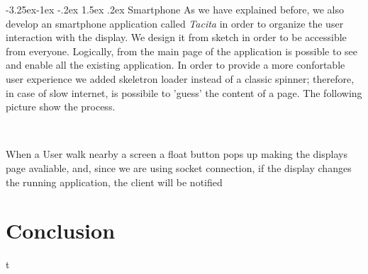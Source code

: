 \documentclass[]{usiinfbachelorproject}
\makeatletter
\newcommand\subsubsection{\@startsection{subsubsection}{3}{\z@}%
                {-3.25ex\@plus -1ex \@minus -.2ex}%
                {1.5ex \@plus .2ex}%
                {\normalfont\normalsize\bfseries}}
\makeatother
\begin{document}
\subsubsection{Smartphone}
As we have explained before, we also develop an smartphone application called \emph{Tacita} in order to organize the user interaction with the display. We design it from sketch in order to be accessible from everyone. Logically, from the main page of the application is possible to see and enable all the existing application. In order to provide a more confortable user experience we added skeletron loader instead of a classic spinner; therefore, in case of slow internet, is possibile to 'guess' the content of a page. The following picture show the process.
\begin{figure}[H]
  \centering
  \
  \
  \
\end{figure}
When a User walk nearby a screen a float button pops up making the displays page avaliable, and, since we are using socket connection, if the display changes the running application, the client will be notified

\section{Conclusion}
 
t




\end{document}
